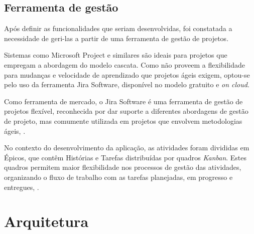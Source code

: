 \documentclass[
    12pt,               %
    openright,          %
    oneside,
    a4paper,            %
    BIBLATEX,           %
    TODO,               %
    english,            %
    brazil              %
    ]{ifsp-spo-inf-ctds}
\begin{document}

    \subsection{Ferramenta de gestão}

        Após definir as funcionalidades que seriam desenvolvidas, foi constatada a necessidade de geri-las a partir de uma ferramenta de gestão de projetos.

        Sistemas como Microsoft Project e similares são ideais para projetos que empregam a abordagem do modelo cascata. Como não proveem a flexibilidade para mudanças e velocidade de aprendizado que projetos ágeis exigem, optou-se pelo uso da ferramenta Jira Software, disponível no modelo gratuito e \emph{on cloud}.

        Como ferramenta de mercado, o Jira Software é uma ferramenta de gestão de projetos flexível, reconhecida por dar suporte a diferentes abordagens de gestão de projeto, mas comumente utilizada em projetos que envolvem metodologias ágeis, .

        No contexto do desenvolvimento da aplicação, as atividades foram divididas em Épicos, que contêm Histórias e Tarefas distribuídas por quadros \emph{Kanban}. Estes quadros permitem maior flexibilidade nos processos de gestão das atividades, organizando o fluxo de trabalho com as tarefas planejadas, em progresso e entregues, .


    \section{Arquitetura}


\end{document}
